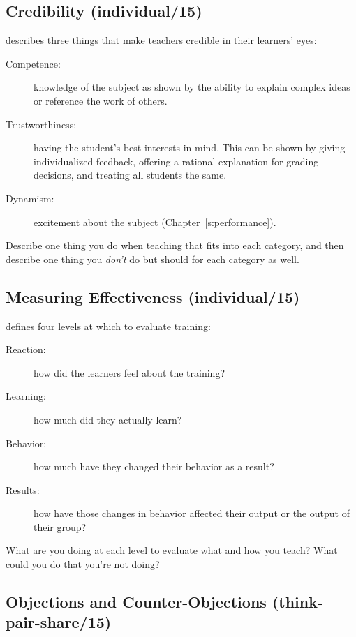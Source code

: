 \subsection*{Credibility (individual/15)}

\cite{Fink2013} describes three things that make teachers credible in
their learners' eyes:

\begin{description}
\item[Competence:]
knowledge of the subject as shown by the ability to explain complex
ideas or reference the work of others.
\item[Trustworthiness:]
having the student's best interests in mind. This can be shown by
giving individualized feedback, offering a rational explanation for
grading decisions, and treating all students the same.
\item[Dynamism:]
excitement about the subject (Chapter~\ref{s:performance}).
\end{description}

Describe one thing you do when teaching that fits into each category,
and then describe one thing you \emph{don't} do but should for each category
as well.

\subsection*{Measuring Effectiveness (individual/15)}

\cite{Kirk1994} defines four levels at which to evaluate training:

\begin{description}
\item[Reaction:]
how did the learners feel about the training?
\item[Learning:]
how much did they actually learn?
\item[Behavior:]
how much have they changed their behavior as a result?
\item[Results:]
how have those changes in behavior affected their output or the
output of their group?
\end{description}

What are you doing at each level to evaluate what and how you teach?
What could you do that you're not doing?

\subsection*{Objections and Counter-Objections (think-pair-share/15)}

